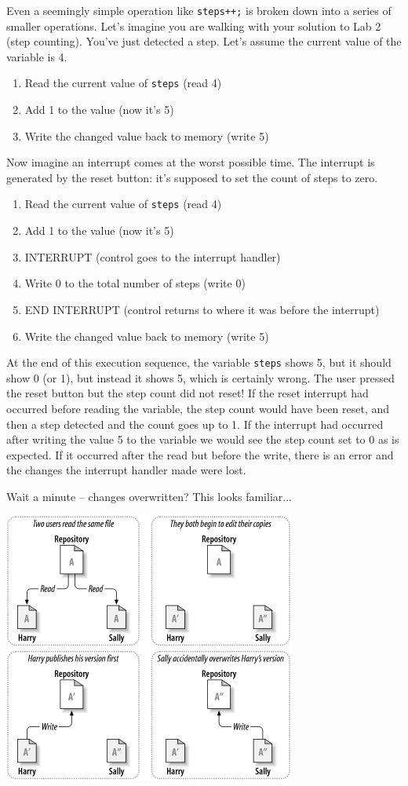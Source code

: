 Even a seemingly simple operation like \texttt{steps++;} is broken down into a series of smaller operations. Let's imagine you are walking with your solution to Lab 2 (step counting). You've just detected a step. Let's assume the current value of the variable is 4.

\begin{enumerate}
	\item Read the current value of \texttt{steps} (read 4)
	\item Add 1 to the value (now it's 5)
	\item Write the changed value back to memory (write 5)
\end{enumerate}

Now imagine an interrupt comes at the worst possible time. The interrupt is generated by the reset button: it's supposed to set the count of steps to zero.

\begin{enumerate}
	\item Read the current value of \texttt{steps} (read 4)
	\item Add 1 to the value (now it's 5)
	\item INTERRUPT (control goes to the interrupt handler)
	\item Write 0 to the total number of steps (write 0)
	\item END INTERRUPT (control returns to where it was before the interrupt)
	\item Write the changed value back to memory (write 5)
\end{enumerate}

At the end of this execution sequence, the variable \texttt{steps} shows 5, but it should show 0 (or 1), but instead it shows 5, which is certainly wrong. The user pressed the reset button but the step count did not reset! If the reset interrupt had occurred before reading the variable, the step count would have been reset, and then a step detected and the count goes up to 1. If the interrupt had occurred after writing the value 5 to the variable we would see the step count set to 0 as is expected. If it occurred after the read but before the write, there is an error and the changes the interrupt handler made were lost.

Wait a minute -- changes overwritten? This looks familiar...

\begin{center}
	\includegraphics[width=.5\textwidth]{images/ch02dia2.png}
	~\cite{svnbook}
\end{center}

